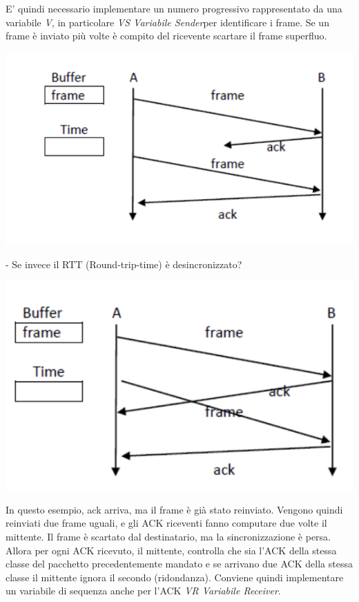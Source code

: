 \documentclass[11pt, oneside]{article}   	%
\begin{document}
E' quindi necessario implementare un numero progressivo rappresentato da una variabile \emph{V}, in particolare \emph{VS Variabile Sender}per identificare i frame. Se un frame è inviato più volte è compito del ricevente scartare il frame superfluo.
\begin{center}
\includegraphics[scale=0.6]{ack1}
\end{center}
- Se invece il RTT (Round-trip-time) è desincronizzato?
\begin{center}
\includegraphics[scale=0.6]{ack2}
\end{center}
In questo esempio, ack arriva, ma il frame è già stato reinviato. Vengono quindi reinviati due frame uguali, e gli ACK riceventi fanno computare due volte il mittente. Il frame è scartato dal destinatario, ma la sincronizzazione è persa. \\
Allora per ogni ACK ricevuto, il mittente, controlla che sia l’ACK della stessa classe del pacchetto precedentemente mandato e se arrivano due ACK della stessa classe il mittente ignora il secondo (ridondanza). Conviene quindi implementare un variabile di sequenza anche per l'ACK \emph{VR Variabile Receiver}.\\\\
\end{document}
